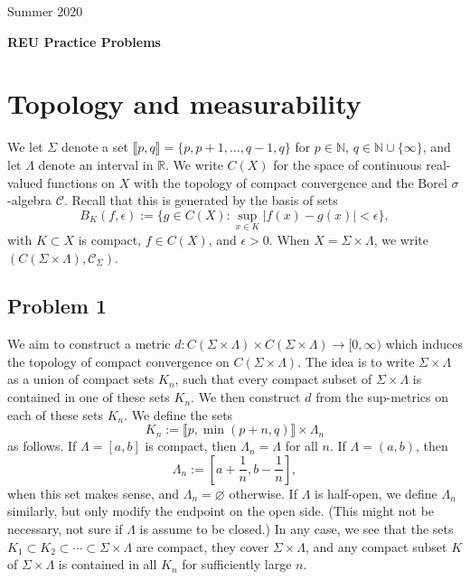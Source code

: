 \documentclass[12pt]{article}
\begin{document}
	\begin{flushright}
		Summer 2020
	\end{flushright}
	
	\begin{center}
		\LARGE\textbf{REU Practice Problems}
	\end{center}


\section{Topology and measurability}

	We let $\Sigma$ denote a set $\llbracket p, q\rrbracket = \{p,p+1,\dots,q-1,q\}$ for $p\in\mathbb{N}$, $q\in\mathbb{N}\cup\{\infty\}$, and let $\Lambda$ denote an interval in $\mathbb{R}$. We write $C(X)$ for the space of continuous real-valued functions on $X$ with the topology of compact convergence and the Borel $\sigma$-algebra $\mathcal{C}$. Recall that this  is generated by the basis of sets
	\[
	B_K(f,\epsilon) := \big\{g\in C(X):\sup_{x\in K} |f(x)-g(x)|<\epsilon\big\},
	\]
	with $K\subset X$ is compact, $f\in C(X)$, and $\epsilon>0$. When $X=\Sigma\times\Lambda$, we write $(C(\Sigma\times\Lambda),\mathcal{C}_\Sigma)$.

	\subsection*{Problem 1}
	
		We aim to construct a metric $d:C(\Sigma\times\Lambda)\times C(\Sigma\times\Lambda)\to [0,\infty)$ which induces the topology of compact convergence on $C(\Sigma\times\Lambda)$. The idea is to write $\Sigma\times\Lambda$ as a union of compact sets $K_n$, such that every compact subset of $\Sigma\times\Lambda$ is contained in one of these sets $K_n$. We then construct $d$ from the sup-metrics on each of these sets $K_n$. We define the sets
		\[
		K_n := \llbracket p, \min(p+n,q)\rrbracket \times \Lambda_n
		\]
		as follows. If $\Lambda=[a,b]$ is compact, then $\Lambda_n=\Lambda$ for all $n$. If $\Lambda=(a,b)$, then
		\[
		\Lambda_n := \left[a+\frac{1}{n}, b-\frac{1}{n}\right],
		\]
		when this set makes sense, and $\Lambda_n=\varnothing$ otherwise. If $\Lambda$ is half-open, we define $\Lambda_n$ similarly, but only modify the endpoint on the open side. (This might not be necessary, not sure if $\Lambda$ is assume to be closed.) In any case, we see that the sets $K_1\subset K_2\subset\cdots\subset\Sigma\times\Lambda$ are compact, they cover $\Sigma\times\Lambda$, and any compact subset $K$ of $\Sigma\times\Lambda$ is contained in all $K_n$ for sufficiently large $n$.
		
\end{document}
